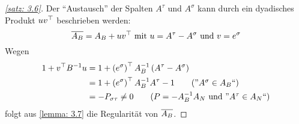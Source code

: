 \begin{proof}[\cref{satz: 3.6}]
	Der \enquote{Austausch} der Spalten $A^\tau$ und $A^\sigma$ kann durch ein dyadisches Produkt $u v^{\top}$ beschrieben werden:
	\begin{equation*}
		\overline{A_B} = A_B + u v^{\top} \text{ mit } u = A^\tau - A^\sigma \text{ und } v = e^\sigma 
	\end{equation*}
	Wegen
	\begin{align*}
		1 + \trans{v} B^{-1} u &= 1 + \transpose{e^\sigma} A_B^{-1} \brackets{A^\tau - A^\sigma} \\ 
		&= 1 + \transpose{e^\sigma} A_B^{-1} A^\tau - 1 \tag{''$A^\sigma \in A_B$``} \\
		&= - P_{\sigma \tau} \neq 0
		\tag{$P = -A_B^{-1}A_N$ und ''$A^\tau \in A_N$``}
	\end{align*}
	folgt aus \cref{lemma: 3.7} die Regularität von $\overline{A_B}$.
\end{proof}

